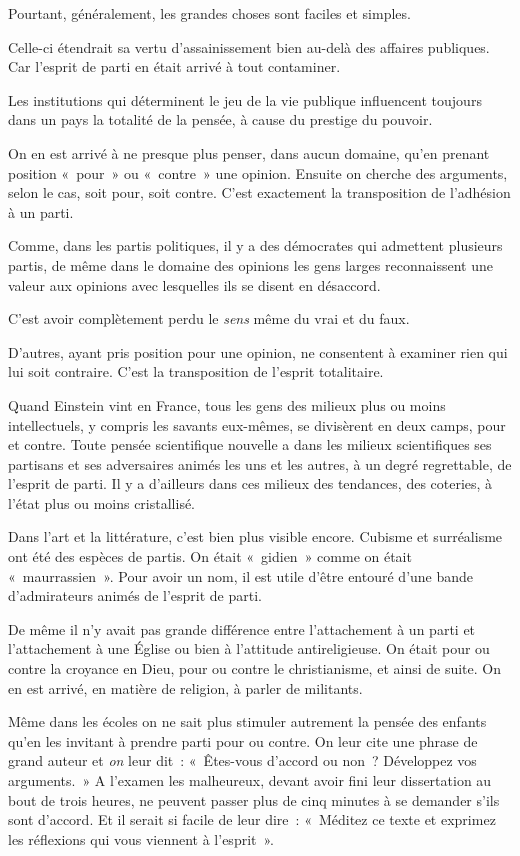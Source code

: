 \documentclass[french,twoside]{book} %
\begin{document}
Pourtant, généralement, les grandes choses sont faciles et simples.\par
Celle-ci étendrait sa vertu d’assainissement bien au-delà des affaires publiques. Car l’esprit de parti en était arrivé à tout contaminer.\par
Les institutions qui déterminent le jeu de la vie publique influencent toujours dans un pays la totalité de la pensée, à cause du prestige du pouvoir.\par
On en est arrivé à ne presque plus penser, dans aucun domaine, qu’en prenant position « pour » ou « contre » une opinion. Ensuite on cherche des arguments, selon le cas, soit pour, soit contre. C’est exactement la transposition de l’adhésion à un parti.\par
Comme, dans les partis politiques, il y a des démocrates qui admettent plusieurs partis, de même dans le domaine des opinions les gens larges reconnaissent une valeur aux opinions avec lesquelles ils se disent en désaccord.\par
C’est avoir complètement perdu le \emph{sens} même du vrai et du faux.\par
D’autres, ayant pris position pour une opinion, ne consentent à examiner rien qui lui soit contraire. C’est la transposition de l’esprit totalitaire.\par
Quand Einstein vint en France, tous les gens des milieux plus ou moins intellectuels, y compris les savants eux-mêmes, se divisèrent en deux camps, pour et contre. Toute pensée scientifique nouvelle a dans les milieux scientifiques ses partisans et ses adversaires animés les uns et les autres, à un degré regrettable, de l’esprit de parti. Il y a d’ailleurs dans ces milieux des tendances, des coteries, à l’état plus ou moins cristallisé.\par
Dans l’art et la littérature, c’est bien plus visible encore. Cubisme et surréalisme ont été des espèces de partis. On était « gidien » comme on était « maurrassien ». Pour avoir un nom, il est utile d’être entouré d’une bande d’admirateurs animés de l’esprit de parti.\par
De même il n’y avait pas grande différence entre l’attachement à un parti et l’attachement à une Église ou bien à l’attitude antireligieuse. On était pour ou contre la croyance en Dieu, pour ou contre le christianisme, et ainsi de suite. On en est arrivé, en matière de religion, à parler de militants.\par
Même dans les écoles on ne sait plus stimuler autrement la pensée des enfants qu’en les invitant à prendre parti pour ou contre. On leur cite une phrase de grand auteur et \emph{on} leur dit : « Êtes-vous d’accord ou non ? Développez vos arguments. » A l’examen les malheureux, devant avoir fini leur dissertation au bout de trois heures, ne peuvent passer plus de cinq minutes à se demander s’ils sont d’accord. Et il serait si facile de leur dire : « Méditez ce texte et exprimez les réflexions qui vous viennent à l’esprit ».\par
\end{document}
